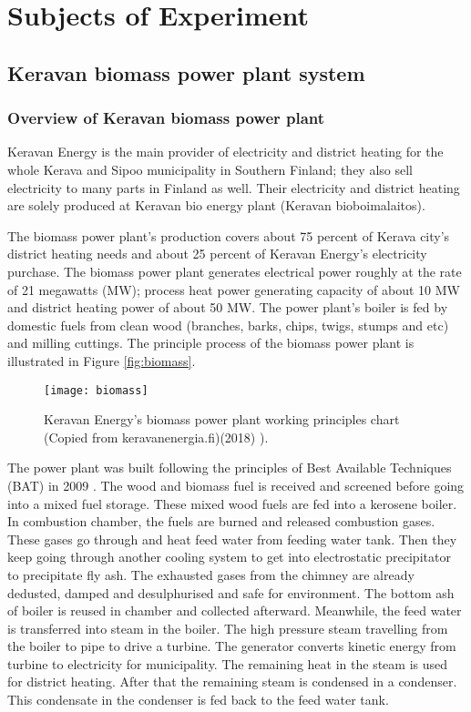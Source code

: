 
\chapter{Subjects of Experiment}

\section{Keravan biomass power plant system}

\subsection{Overview of Keravan biomass power plant}

Keravan Energy is the main provider of electricity and district heating for the whole Kerava and Sipoo municipality in Southern Finland; they also sell electricity to many parts in Finland as well. Their electricity and district heating are solely produced at Keravan bio energy plant (Keravan bioboimalaitos).\cite{kerava:web}

The biomass power plant's production covers about 75 percent of Kerava city's district heating needs and about 25 percent of Keravan Energy's electricity purchase. The biomass power plant generates electrical power roughly at the rate of 21 megawatts (MW); process heat power generating capacity of about 10 MW and district heating power of about 50 MW. The power plant's boiler is fed by domestic fuels from clean wood (branches, barks, chips, twigs, stumps and etc) and milling cuttings. The principle process of the biomass power plant is illustrated in Figure \vref{fig:biomass}.

\begin{figure}[h]
  \centering
  \texttt{[image: biomass]}
  \caption{ Keravan Energy's biomass power plant working principles chart (Copied from keravanenergia.fi)(2018) \cite{kerava:web}).}
  \label{fig:biomass}
\end{figure}

The power plant was built following the principles of Best Available Techniques (BAT) in 2009 \cite{kerava:web}. The wood and biomass fuel is received and screened before going into a mixed fuel storage. These mixed wood fuels are fed into a kerosene boiler. In combustion chamber, the fuels are burned and released combustion gases. These gases go through and heat feed water from feeding water tank. Then they keep going through another cooling system to get into electrostatic precipitator to precipitate fly ash. The exhausted gases from the chimney are already dedusted, damped and desulphurised and safe for environment. The bottom ash of boiler is reused in chamber and collected afterward. Meanwhile, the feed water is transferred into steam in the boiler. The high pressure steam travelling from the boiler to pipe to drive a turbine. The generator converts kinetic energy from turbine to electricity for municipality. The remaining heat in the steam is used for district heating. After that the remaining steam is condensed in a condenser. This condensate in the condenser is fed back to the feed water tank.

